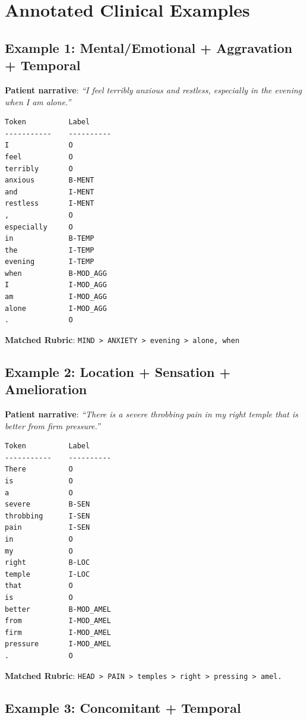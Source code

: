 
\section{Annotated Clinical Examples}

\subsection{Example 1: Mental/Emotional + Aggravation + Temporal}

\textbf{Patient narrative}: \textit{``I feel terribly anxious and restless, especially in the evening when I am alone.''}

\begin{verbatim}
Token          Label
-----------    ----------
I              O
feel           O
terribly       O
anxious        B-MENT
and            I-MENT
restless       I-MENT
,              O
especially     O
in             B-TEMP
the            I-TEMP
evening        I-TEMP
when           B-MOD_AGG
I              I-MOD_AGG
am             I-MOD_AGG
alone          I-MOD_AGG
.              O
\end{verbatim}

\textbf{Matched Rubric}: \texttt{MIND > ANXIETY > evening > alone, when}

\subsection{Example 2: Location + Sensation + Amelioration}

\textbf{Patient narrative}: \textit{``There is a severe throbbing pain in my right temple that is better from firm pressure.''}

\begin{verbatim}
Token          Label
-----------    ----------
There          O
is             O
a              O
severe         B-SEN
throbbing      I-SEN
pain           I-SEN
in             O
my             O
right          B-LOC
temple         I-LOC
that           O
is             O
better         B-MOD_AMEL
from           I-MOD_AMEL
firm           I-MOD_AMEL
pressure       I-MOD_AMEL
.              O
\end{verbatim}

\textbf{Matched Rubric}: \texttt{HEAD > PAIN > temples > right > pressing > amel.}

\subsection{Example 3: Concomitant + Temporal}


